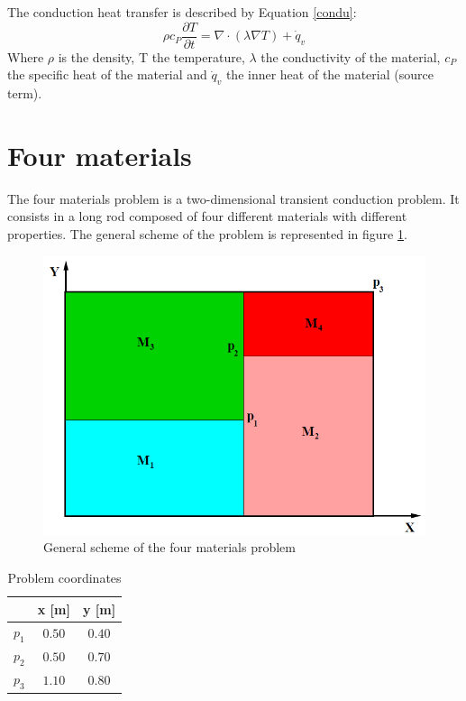 The conduction heat transfer is described by Equation \ref{condu}:
\begin{equation}
\rho c_{P}\frac{\partial T}{\partial t}=\nabla\cdot\left(\lambda\nabla T\right)+\dot{q}_{v}
\label{condu}
\end{equation}
Where $\rho$ is the density, T the temperature, $\lambda$ the conductivity of the material, $c_{P}$ the specific heat of the material and $\dot{q}_{v}$ the inner heat of the material (source term).

\section{Four materials}
The four materials problem is a two-dimensional transient conduction problem. It consists in a long rod composed of four different materials with different properties. The general scheme of the problem is represented in figure \ref{fourmaterials}.
\begin{figure}[h]
	\centering
	\includegraphics[scale = 0.8]{FourMaterials/Fourmaterials}
	\caption{General scheme of the four materials problem}
	\label{fourmaterials}
\end{figure}
\begin{table}[h!]
	\centering
	\begin{tabular}{ |c|c|c|}
		\hline
		  & x [m] & y [m] \\ \hline
		 $p_{1}$ & $0.50$ & $0.40$ \\ \hline
		 $p_{2}$ & $0.50$ & $0.70$ \\ \hline
		 $p_{3}$ & $1.10$ & $0.80$ \\ \hline
	\end{tabular}
\caption{Problem coordinates}
\end{table}
